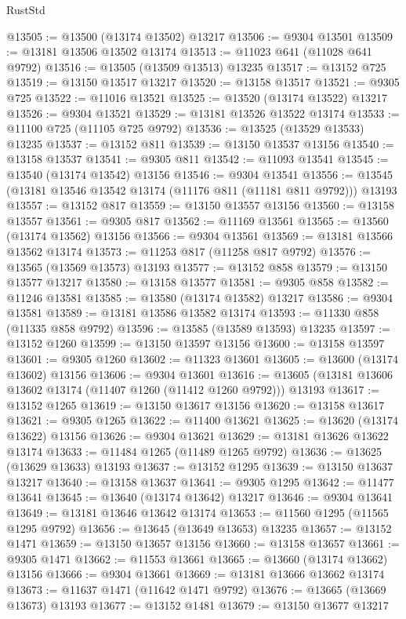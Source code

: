 \begin{lexlean}{RustStd}
\begin{coremodule}
@13505 := @13500 (@13174 @13502) @13217
@13506 := @9304 @13501
@13509 := @13181 @13506 @13502 @13174
@13513 := @11023 @641 (@11028 @641 @9792)
@13516 := @13505 (@13509 @13513) @13235
@13517 := @13152 @725
@13519 := @13150 @13517 @13217
@13520 := @13158 @13517
@13521 := @9305 @725
@13522 := @11016 @13521
@13525 := @13520 (@13174 @13522) @13217
@13526 := @9304 @13521
@13529 := @13181 @13526 @13522 @13174
@13533 := @11100 @725 (@11105 @725 @9792)
@13536 := @13525 (@13529 @13533) @13235
@13537 := @13152 @811
@13539 := @13150 @13537 @13156
@13540 := @13158 @13537
@13541 := @9305 @811
@13542 := @11093 @13541
@13545 := @13540 (@13174 @13542) @13156
@13546 := @9304 @13541
@13556 := @13545 (@13181 @13546 @13542 @13174 (@11176 @811 (@11181 @811 @9792))) @13193
@13557 := @13152 @817
@13559 := @13150 @13557 @13156
@13560 := @13158 @13557
@13561 := @9305 @817
@13562 := @11169 @13561
@13565 := @13560 (@13174 @13562) @13156
@13566 := @9304 @13561
@13569 := @13181 @13566 @13562 @13174
@13573 := @11253 @817 (@11258 @817 @9792)
@13576 := @13565 (@13569 @13573) @13193
@13577 := @13152 @858
@13579 := @13150 @13577 @13217
@13580 := @13158 @13577
@13581 := @9305 @858
@13582 := @11246 @13581
@13585 := @13580 (@13174 @13582) @13217
@13586 := @9304 @13581
@13589 := @13181 @13586 @13582 @13174
@13593 := @11330 @858 (@11335 @858 @9792)
@13596 := @13585 (@13589 @13593) @13235
@13597 := @13152 @1260
@13599 := @13150 @13597 @13156
@13600 := @13158 @13597
@13601 := @9305 @1260
@13602 := @11323 @13601
@13605 := @13600 (@13174 @13602) @13156
@13606 := @9304 @13601
@13616 := @13605 (@13181 @13606 @13602 @13174 (@11407 @1260 (@11412 @1260 @9792))) @13193
@13617 := @13152 @1265
@13619 := @13150 @13617 @13156
@13620 := @13158 @13617
@13621 := @9305 @1265
@13622 := @11400 @13621
@13625 := @13620 (@13174 @13622) @13156
@13626 := @9304 @13621
@13629 := @13181 @13626 @13622 @13174
@13633 := @11484 @1265 (@11489 @1265 @9792)
@13636 := @13625 (@13629 @13633) @13193
@13637 := @13152 @1295
@13639 := @13150 @13637 @13217
@13640 := @13158 @13637
@13641 := @9305 @1295
@13642 := @11477 @13641
@13645 := @13640 (@13174 @13642) @13217
@13646 := @9304 @13641
@13649 := @13181 @13646 @13642 @13174
@13653 := @11560 @1295 (@11565 @1295 @9792)
@13656 := @13645 (@13649 @13653) @13235
@13657 := @13152 @1471
@13659 := @13150 @13657 @13156
@13660 := @13158 @13657
@13661 := @9305 @1471
@13662 := @11553 @13661
@13665 := @13660 (@13174 @13662) @13156
@13666 := @9304 @13661
@13669 := @13181 @13666 @13662 @13174
@13673 := @11637 @1471 (@11642 @1471 @9792)
@13676 := @13665 (@13669 @13673) @13193
@13677 := @13152 @1481
@13679 := @13150 @13677 @13217

\end{coremodule}
\end{lexlean}
